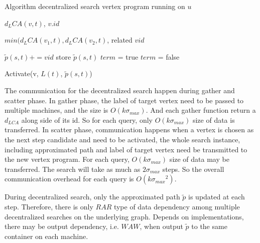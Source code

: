 \begin{algorithm}
    \caption{Algorithm decentralized search vertex program running on $u$}
		\label{alg:vc_dec}
    \begin{algorithmic}
        \State \Return $d_LCA(v, t)$, $v.id$
        \EndFunction

        \State \Return $min(d_LCA(v_1,t), d_LCA(v_2,t)$, related $vid$
        \EndFunction

        \State $\tilde{p}(s,t) += vid$
            \State store $\tilde{p}(s,t)$
            \State $term$ = true
        \Else
            \State $term$ = false
        \EndIf
        \EndFunction

            \State Activate(v, $L(t)$, $\tilde{p}(s,t)$)
        \EndIf
        \EndFunction
    \end{algorithmic}
\end{algorithm}

The communication for the decentralized search happen during gather and scatter phase. In gather phase, the label of target vertex need to be passed to multiple machines, and the size is $O(k{\sigma}_{max})$. And each gather function return a $d_{LCA}$ along side of its id. So for each query, only $O(k{\sigma}_{max})$ size of data is transferred. In scatter phase, communication happens when a vertex is chosen as the next step candidate and need to be activated, the whole search instance, including approximated path and label of target vertex need be transmitted to the new vertex program. For each query, $O(k{\sigma}_{max})$ size of data may be transferred. The search will take as much as $2{\sigma}_{max}$ steps. So the overall communication overhead for each query is $O(k{{\sigma}_{max}}^2)$. 

During decentralized search, only the approximated path $\tilde{p}$ is updated at each step. Therefore, there is only $RAR$ type of data dependency among multiple decentralized searches on the underlying graph. Depends on implementations, there may be output dependency, i.e. $WAW$, when output $\tilde{p}$ to the same container on each machine.

